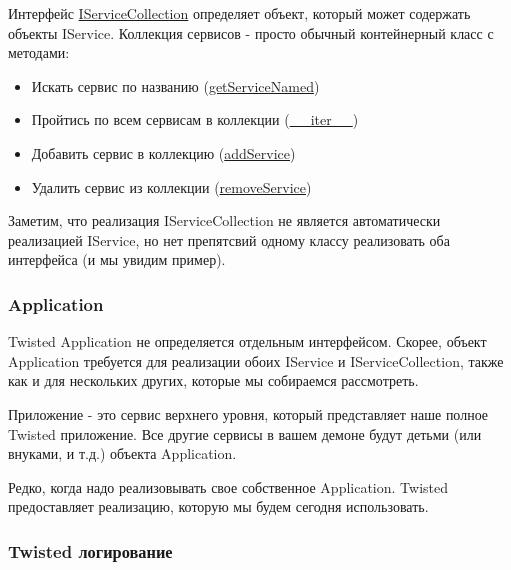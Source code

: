 Интерфейс \href{http://twistedmatrix.com/trac/browser/tags/releases/twisted-10.0.0/twisted/application/service.py#L203}{IServiceCollection} определяет объект, который 
может содержать объекты IService. Коллекция сервисов - просто 
обычный контейнерный класс с методами:

\begin{itemize}

\item Искать сервис по названию (\href{http://twistedmatrix.com/trac/browser/tags/releases/twisted-10.0.0/twisted/application/service.py#L212}{getServiceNamed})

\item Пройтись по всем сервисам в коллекции (\href{http://twistedmatrix.com/trac/browser/tags/releases/twisted-10.0.0/twisted/application/service.py#L222}{\_\_iter\_\_})

\item Добавить сервис в коллекцию (\href{http://twistedmatrix.com/trac/browser/tags/releases/twisted-10.0.0/twisted/application/service.py#L227}{addService})

\item Удалить сервис из коллекции (\href{http://twistedmatrix.com/trac/browser/tags/releases/twisted-10.0.0/twisted/application/service.py#L236}{removeService})

\end{itemize}


Заметим, что реализация IServiceCollection не 
является автоматически реализацией IService, 
но нет препятсвий одному классу реализовать 
оба интерфейса (и мы увидим пример).


\subsubsection{Application}

Twisted Application не определяется отдельным интерфейсом. 
Скорее, объект Application требуется для реализации обоих 
IService и IServiceCollection, также как и для нескольких других, 
которые мы собираемся рассмотреть. 


Приложение - это сервис верхнего уровня, который представляет 
наше полное Twisted приложение. Все другие сервисы в вашем 
демоне будут детьми (или внуками, и т.д.) объекта Application. 


Редко, когда надо реализовывать свое собственное Application. 
Twisted предоставляет реализацию, которую мы будем 
сегодня использовать.

\subsubsection{Twisted логирование}


